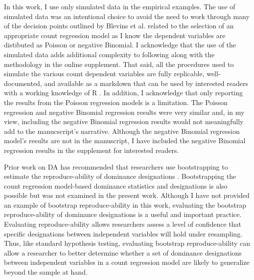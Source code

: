\documentclass[man]{apa7}
\begin{document}
	In this work, I use only simulated data in the empirical examples.
	The use of simulated data was an intentional choice to avoid the need to work through many of the decision points outlined by Blevins et al. \parencite*{blevins2015count} related to the selection of an appropriate count regression model as I know the dependent variables are distibuted as Poisson or negative Binomial.
	I acknowledge that the use of the simulated data adds additional complexity to following along with the methodology in the online supplement.
	That said, all the procedures used to simulate the various count dependent variables are fully replicable, well-documented, and available as a markdown that can be used by interested readers with a working knowledge of R \parencite{R}.
	In addition, I acknowledge that only reporting the results from the Poisson regression models is a limitation.
	The Poisson regression and negative Binomial regression results were very similar and, in my view, including the negative Binomial regression results would not meaningfully add to the manucscript's narrative.
	Although the negative Binomial regression model's results are not in the manuscript, I have included the negative Binomial regression results in the supplement for interested readers.
	
	Prior work on DA has recommended that researchers use bootstrapping to estimate the reproduce-ability of dominance designations \parencite{azen2003dominance}. 
	Bootstrapping the count regression model-based dominance statistics and designations is also possible but was not examined in the present work.
	Although I have not provided an example of bootstrap reproduce-ability in this work, evaluating the bootstrap reproduce-ability of dominance designations is a useful and important practice.
	Evaluating reproduce-ability allows researchers assess a level of confidence that specific designations between independent variables will hold under resampling.
	Thus, like standard hypothesis testing, evaluating bootstrap reproduce-ability can allow a researcher to better determine whether a set of dominance designations between independent variables in a count regression model are likely to generalize beyond the sample at hand.
	
\end{document}
